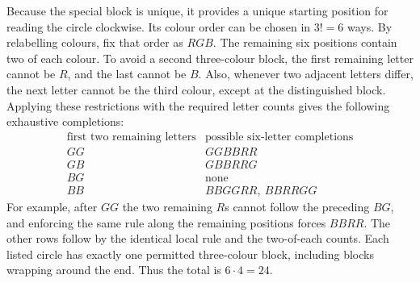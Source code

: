 Because the special block is unique, it provides a unique starting position for reading the circle clockwise. Its colour order can be chosen in $3!=6$ ways. By relabelling colours, fix that order as $RGB$. The remaining six positions contain two of each colour.
To avoid a second three-colour block, the first remaining letter cannot be $R$, and the last cannot be $B$. Also, whenever two adjacent letters differ, the next letter cannot be the third colour, except at the distinguished block. Applying these restrictions with the required letter counts gives the following exhaustive completions:
\[\begin{array}{c|c}
\text{first two remaining letters}&\text{possible six-letter completions}\\\hline
GG&GGBBRR\\GB&GBBRRG\\BG&\text{none}\\BB&BBGGRR,\ BBRRGG
\end{array}\]
For example, after $GG$ the two remaining $R$s cannot follow the preceding $BG$, and enforcing the same rule along the remaining positions forces $BBRR$. The other rows follow by the identical local rule and the two-of-each counts. Each listed circle has exactly one permitted three-colour block, including blocks wrapping around the end. Thus the total is $\boxed{6\cdot4=24}$.
